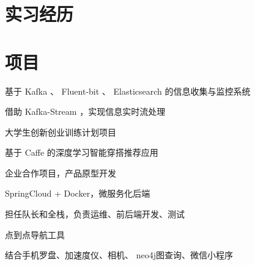 \documentclass[]{deedy-resume-openfont}
\begin{document}
\begin{minipage}[t]{0.68\textwidth} 


\section{实习经历}
\sectionsep


\sectionsep


\section{项目}
\sectionsep

\vspace{\topsep}
\begin{tightemize}
    \item 基于 Kafka 、 Fluent-bit 、 Elasticsearch 的信息收集与监控系统
    \item 借助 Kafka-Stream ，实现信息实时流处理
\end{tightemize}
\sectionsep

\begin{tightemize}
    \item 大学生创新创业训练计划项目
    \item 基于 Caffe 的深度学习智能穿搭推荐应用
\end{tightemize}

\sectionsep

\begin{tightemize}
    \item 企业合作项目，产品原型开发
    \item SpringCloud + Docker，微服务化后端
\end{tightemize}

\sectionsep

\begin{tightemize}
    \item 担任队长和全栈，负责运维、前后端开发、测试
    \item 点到点导航工具
    \item 结合手机罗盘、加速度仪、相机、 neo4j图查询、微信小程序
\end{tightemize}
\sectionsep


\end{minipage}
\end{document}
